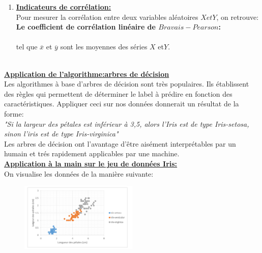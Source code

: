 \documentclass[11pt,twoside,openany,x11names,svgnames]{memoir}
\begin{document}
\begin{itemize}
\begin{enumerate}
		
		\item{{\large{\textbf{\underline{Indicateurs de corrélation:}}}}} \\
		Pour mesurer la corrélation entre deux variables aléatoires $X et Y$, on retrouve: \\
		{\textbf{Le coefficient de corrélation linéaire de $Bravais-Pearson$:}} \\
		\hspace{3cm}{ \[corr(X,Y) = \frac{{\operatorname{cov} (X,Y)}}{{{\sigma _X}{\sigma _Y}}} = \frac{{\frac{1}{n}\sum\limits_{i = 1}^n {({x_i} - \bar x)({y_i} - \bar y)} }}{{{\sigma _X}{\sigma _Y}}}\] }
		\\
		tel que $\overline{x}$ et $\overline{y}$ sont les moyennes des séries $X$ et$Y$.  
		
		\end{enumerate} \\
		{{\large{\textbf{\underline{Application de l'algorithme:arbres de décision}}}}} \\
		Les algorithmes à base d'arbres de décision sont très populaires. Ils établissent des règles qui permettent de déterminer le label à prédire en fonction des caractéristiques. Appliquer ceci sur nos données donnerait un résultat de la forme: \\
		\hspace{3cm} \textsl{"Si la largeur des pétales est inférieur à 3,5, alors l'Iris est de type Iris-setosa, sinon l'iris est de type Iris-virginica"} \\
		
		Les arbres de décision ont l'avantage d'être aisément interprétables par un humain et trés rapidement applicables par une machine.\\
		{{\large{\textbf{\underline{Application à la main sur le jeu de données Iris:}}}}} \\
		On visualise les données de la manière suivante: \\
		
		
\begin{figure}[h]
			\centering
				\includegraphics[width=0.5\textwidth]{img4_iris.png}
			\label{}
		\end{figure} \\
		

\end{itemize}
\end{document}
